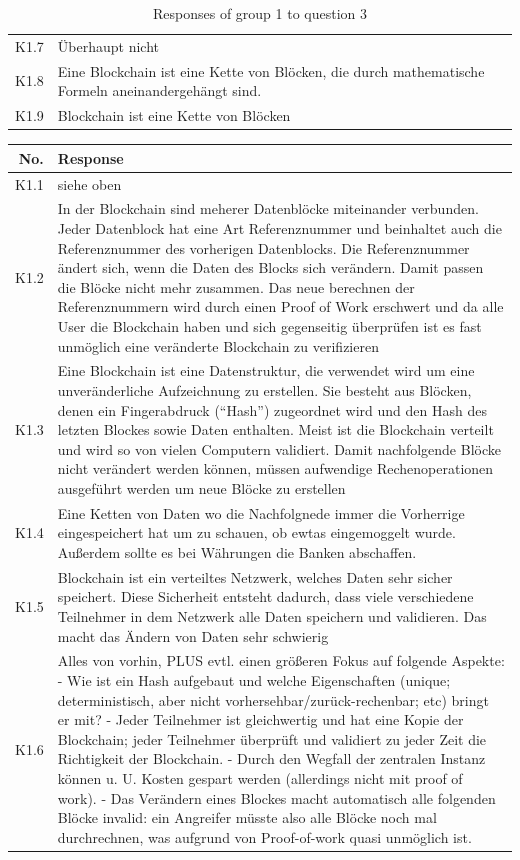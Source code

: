\begin{table}[H]
\begin{tabularx}{\textwidth}{r|X}
         K1.7 & Überhaupt nicht\\
         K1.8 & Eine Blockchain ist eine Kette von Blöcken, die durch mathematische Formeln aneinandergehängt sind. \\
         K1.9 & Blockchain ist eine Kette von Blöcken \\
    \end{tabularx}
    \caption{Responses of group 1 to question 3}
    \label{tab:Video3}
\end{table}


\begin{table}[H]
    \centering
    \begin{tabularx}{\textwidth}{r|X}
        No. & Response \\ \hline
         K1.1 & siehe oben\\
         K1.2 & In der Blockchain sind meherer Datenblöcke miteinander verbunden. Jeder Datenblock hat eine Art Referenznummer und beinhaltet auch die Referenznummer des vorherigen Datenblocks. Die Referenznummer ändert sich, wenn die Daten des Blocks sich verändern. Damit passen die Blöcke nicht mehr zusammen. Das neue berechnen der Referenznummern wird durch einen Proof of Work erschwert und da alle User die Blockchain haben und sich gegenseitig überprüfen ist es fast unmöglich eine veränderte Blockchain zu verifizieren \\
         K1.3 & Eine Blockchain ist eine Datenstruktur, die verwendet wird um eine unveränderliche Aufzeichnung zu erstellen. Sie besteht aus Blöcken, denen ein Fingerabdruck (“Hash”) zugeordnet wird und den Hash des letzten Blockes sowie Daten enthalten. Meist ist die Blockchain verteilt und wird so von vielen Computern validiert. Damit nachfolgende Blöcke nicht verändert werden können, müssen aufwendige Rechenoperationen ausgeführt werden um neue Blöcke zu erstellen \\
         K1.4 & Eine Ketten von Daten wo die Nachfolgnede immer die Vorherrige eingespeichert hat um zu schauen, ob ewtas eingemoggelt wurde. Außerdem sollte es bei Währungen die Banken abschaffen. \\
         K1.5 & Blockchain ist ein verteiltes Netzwerk, welches Daten sehr sicher speichert. Diese Sicherheit entsteht dadurch, dass viele verschiedene Teilnehmer in dem Netzwerk alle Daten speichern und validieren. Das macht das Ändern von Daten sehr schwierig \\
         K1.6 & Alles von vorhin, PLUS evtl. einen größeren Fokus auf folgende Aspekte: - Wie ist ein Hash aufgebaut und welche Eigenschaften (unique; deterministisch, aber nicht vorhersehbar/zurück-rechenbar; etc) bringt er mit? - Jeder Teilnehmer ist gleichwertig und hat eine Kopie der Blockchain; jeder Teilnehmer überprüft und validiert zu jeder Zeit die Richtigkeit der Blockchain. - Durch den Wegfall der zentralen Instanz können u. U. Kosten gespart werden (allerdings nicht mit proof of work). - Das Verändern eines Blockes macht automatisch alle folgenden Blöcke invalid: ein Angreifer müsste also alle Blöcke noch mal durchrechnen, was aufgrund von Proof-of-work quasi unmöglich ist.\\

\end{tabularx}
\end{table}
